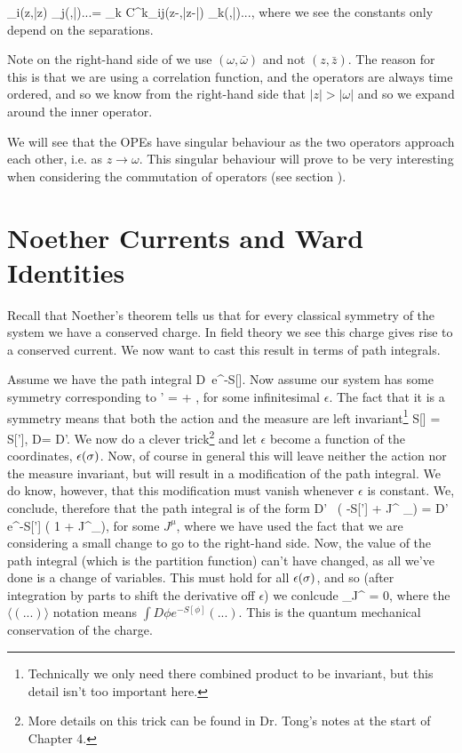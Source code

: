 \be 
\label{eqn:OPE}
    \langle\cO_i(z,\bar{z}) \cO_j(\omega,\bar{\omega})...\rangle = \sum_{k} C^k_{ij}(z-\omega,\bar{z}-\bar{\omega}) \langle\cO_k(\omega,\bar{\omega})...\rangle,
\ee 
where we see the constants only depend on the separations. 

\br 
Note on the right-hand side of  we use $(\omega,\bar{\omega})$ and not $(z,\bar{z})$. The reason for this is that we are using a correlation function, and the operators are always time ordered, and so we know from the right-hand side that $|z|>|\omega|$ and so we expand around the inner operator.
\er 

\br 
\label{rem:OPESingular}
We will see that the OPEs have singular behaviour as the two operators approach each other, i.e. as $z\to\omega$. This singular behaviour will prove to be very interesting when considering the commutation of operators (see section ).
\er 

\section{Noether Currents and Ward Identities}

Recall that Noether's theorem tells us that for every classical symmetry of the system we have a conserved charge. In field theory we see this charge gives rise to a conserved current. We now want to cast this result in terms of path integrals. 

Assume we have the path integral
\bse 
    \int D\phi \, e^{-S[\phi]}.
\ese 
Now assume our system has some symmetry corresponding to 
\bse 
    \phi \to \phi' = \phi + \epsilon \del \phi,
\ese 
for some infinitesimal $\epsilon$. The fact that it is a symmetry means that both the action and the measure are left invariant\footnote{Technically we only need there combined product to be invariant, but this detail isn't too important here.}
\bse 
    S[\phi] = S[\phi'], \qquad {} \qquad D\phi = D\phi'.
\ese 
We now do a clever trick\footnote{More details on this trick can be found in Dr. Tong's notes at the start of Chapter 4.} and let $\epsilon$ become a function of the coordinates, $\epsilon(\sigma)$. Now, of course in general this will leave neither the action nor the measure invariant, but will result in a modification of the path integral. We do know, however, that this modification must vanish whenever $\epsilon$ is constant. We, conclude, therefore that the path integral is of the form 
\bse 
    \int D\phi' \, \exp \bigg( -S[\phi'] + \int J^{\mu} \p_{\mu}\epsilon \bigg) = \int D\phi' \, e^{-S[\phi']} \bigg( 1 + \int J^{\mu}\p_{\mu}\epsilon\bigg),
\ese 
for some $J^{\mu}$, where we have used the fact that we are considering a small change to go to the right-hand side. Now, the value of the path integral (which is the partition function) can't have changed, as all we've done is a change of variables. This must hold for all $\epsilon(\sigma)$, and so (after integration by parts to shift the derivative off $\epsilon$) we conlcude 
\be 
\label{eqn:NoetherQM}
    \langle \p_{\mu}J^{\mu} \rangle = 0,
\ee 
where the $\langle (...)\rangle$ notation means $\int D\phi e^{-S[\phi]}(...)$. This is the quantum mechanical conservation of the charge. 

